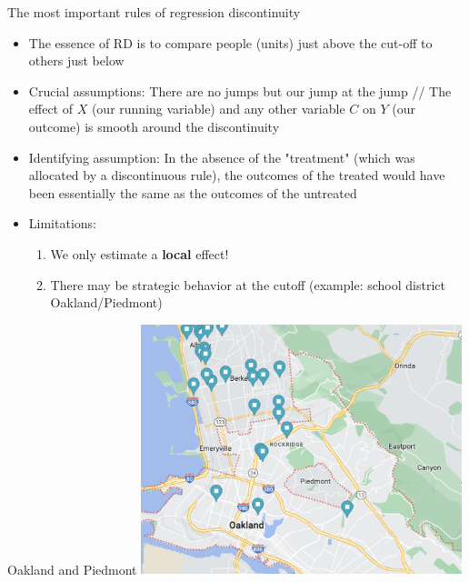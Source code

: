 \documentclass[11pt,xcolor=table]{beamer}
\begin{document}
\begin{frame}{The most important rules of regression discontinuity}

    \begin{itemize}
        \item The essence of RD is to compare people (units) just above the cut-off to others just below
        \item Crucial assumptions: There are no jumps but our jump at the jump // The effect of $X$ (our running variable) and any other variable $C$ on $Y$ (our outcome) is smooth around the discontinuity
        \item Identifying assumption: In the absence of the "treatment" (which was allocated by a discontinuous rule), the outcomes of the treated would have been essentially the same as the outcomes of the untreated
        \item Limitations: 
        \begin{enumerate}
            \item We only estimate a \textbf{local} effect!
            \item There may be strategic behavior at the cutoff (example: school district Oakland/Piedmont)
        \end{enumerate} 
        
    \end{itemize}
\end{frame}


\begin{frame}{Oakland and Piedmont }
    \includegraphics[width=0.7\textwidth]{figures/piedmont.png}
\end{frame}
\end{document}
